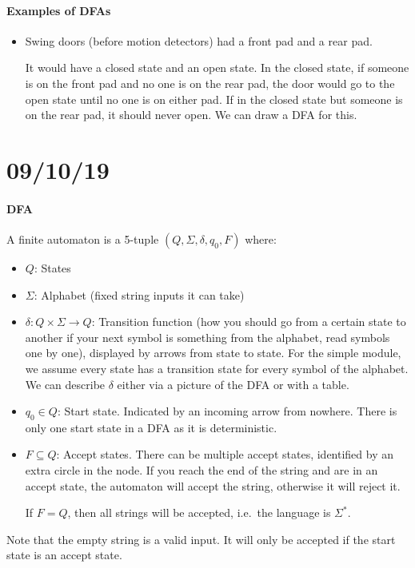 \documentclass[12 pt]{article}
\begin{document}
\paragraph{Examples of DFAs}
\begin{itemize}
\item Swing doors (before motion detectors) had a front pad and a rear
  pad.

  It would have a closed state and an open state. In the closed state,
  if someone is on the front pad and no one is on the rear pad, the
  door would go to the open state until no one is on either pad. If in
  the closed state but someone is on the rear pad, it should never
  open. We can draw a DFA for this.
\end{itemize}
\section{09/10/19}
\paragraph{DFA} A finite automaton is a 5-tuple $(Q, \Sigma, \delta,
q_0, F)$ where:
\begin{itemize}
\item $Q$: States
\item $\Sigma$: Alphabet (fixed string inputs it can take)
\item $\delta: Q \times \Sigma \to Q$: Transition function (how you should go from a certain state to
  another if your next symbol is something from the alphabet, read
  symbols one by one), displayed by arrows from state to state. For
  the simple module, we assume every state has a transition state for
  every symbol of the alphabet. We can describe $\delta$ either via a
  picture of the DFA or with a table.
\item $q_0 \in Q$: Start state. Indicated by an incoming arrow from nowhere. There
  is only one start state in a DFA as it is deterministic.
\item $F \subseteq Q$: Accept states. There can be multiple accept states, identified
  by an extra circle in the node. If you reach the end of the string
  and are in an accept state, the automaton will accept the string,
  otherwise it will reject it.

  If $F = Q$, then all strings will be accepted, i.e.\ the language is $\Sigma^*$.
\end{itemize}
Note that the empty string is a valid input. It will only be accepted
if the start state is an accept state.
\end{document}

